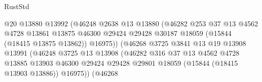 \begin{lexlean}{RustStd}
\begin{coremodule}
                                          @20
                                          @13880
                                          @13992
                                          (@46248
                                            @2638
                                            @13
                                            @13880
                                            (@46282
                                              @253
                                              @37
                                              @13
                                              @4562
                                              @4728
                                              @13861
                                              @13875
                                              @46300
                                              @29424
                                              @29428
                                              @30187
                                              @18059
                                              (@15844 (@18415 @13875 @13862))
                                              @16975))
                                          (@46268
                                            @3725
                                            @3841
                                            @13
                                            @19
                                            @13908
                                            @13991
                                            (@46248
                                              @3725
                                              @13
                                              @13908
                                              (@46282
                                                @316
                                                @37
                                                @13
                                                @4562
                                                @4728
                                                @13885
                                                @13903
                                                @46300
                                                @29424
                                                @29428
                                                @29801
                                                @18059
                                                (@15844 (@18415 @13903 @13886))
                                                @16975))
                                            (@46268

\end{coremodule}
\end{lexlean}
